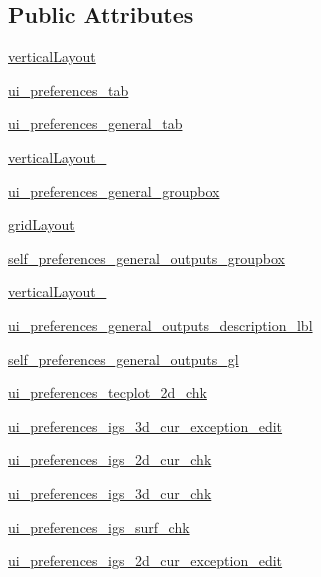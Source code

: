 \subsection*{Public Attributes}
\begin{DoxyCompactItemize}
\item 
\hyperlink{a00106_ad769696a12317c7f92ed3366311bc496}{vertical\+Layout}
\item 
\hyperlink{a00106_aefabfa9bb4d3ece796fee13c167d52fc}{ui\+\_\+preferences\+\_\+tab}
\item 
\hyperlink{a00106_a0f603694eed0cda9d39a0d9bc19c2e10}{ui\+\_\+preferences\+\_\+general\+\_\+tab}
\item 
\hyperlink{a00106_af50058d66700f51fb46a0bab1cf0aa4b}{vertical\+Layout\+\_}
\item 
\hyperlink{a00106_adca7b98e8183192a5fc165c8695d44f5}{ui\+\_\+preferences\+\_\+general\+\_\+groupbox}
\item 
\hyperlink{a00106_a9758be9a7207723c709109813da770fb}{grid\+Layout}
\item 
\hyperlink{a00106_a2dbc9c7187826d35dfb423e2536031c1}{self\+\_\+preferences\+\_\+general\+\_\+outputs\+\_\+groupbox}
\item 
\hyperlink{a00106_af17928a62255c96603422710076dbede}{vertical\+Layout\+\_}
\item 
\hyperlink{a00106_a47018f6a822750d843c3ba200c5dfdd5}{ui\+\_\+preferences\+\_\+general\+\_\+outputs\+\_\+description\+\_\+lbl}
\item 
\hyperlink{a00106_aec77d619b1316cf81f501262151d4388}{self\+\_\+preferences\+\_\+general\+\_\+outputs\+\_\+gl}
\item 
\hyperlink{a00106_a99ea63136960e76164e086bee4b6acb5}{ui\+\_\+preferences\+\_\+tecplot\+\_\+2d\+\_\+chk}
\item 
\hyperlink{a00106_ab28264229e6a9e05bf21541ed645dcb2}{ui\+\_\+preferences\+\_\+igs\+\_\+3d\+\_\+cur\+\_\+exception\+\_\+edit}
\item 
\hyperlink{a00106_a1ce10779ded45f28b6afd571de7c1dc4}{ui\+\_\+preferences\+\_\+igs\+\_\+2d\+\_\+cur\+\_\+chk}
\item 
\hyperlink{a00106_af72b1a9124fb421c1fbe62adb174fe77}{ui\+\_\+preferences\+\_\+igs\+\_\+3d\+\_\+cur\+\_\+chk}
\item 
\hyperlink{a00106_a6ff22661fcefd7225763bd7655ceb36c}{ui\+\_\+preferences\+\_\+igs\+\_\+surf\+\_\+chk}
\item 
\hyperlink{a00106_a4e600e40407001e5ea272f73f359cde8}{ui\+\_\+preferences\+\_\+igs\+\_\+2d\+\_\+cur\+\_\+exception\+\_\+edit}

\end{DoxyCompactItemize}
